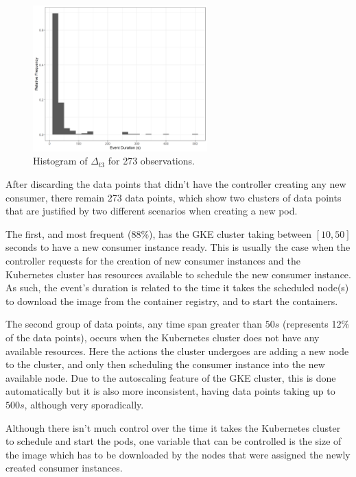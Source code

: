 \begin{figure}[htb!]
\centering
\includegraphics[width=0.6\textwidth]{images/integration/delta3.png}
\caption{
    Histogram of $\Delta_{t3}$ for 273 observations.
}
\label{fig:controller_result_kubernetes}
\end{figure}

After discarding the data points that didn't have the controller creating any
new consumer, there remain 273 data points, which show two clusters of data
points that are justified by two different scenarios when creating a new pod. 

The first, and most frequent (88\%), has the GKE cluster taking between $[10,
50]$ seconds to have a new consumer instance ready. This is usually the case when the
controller requests for the creation of new consumer instances and the
Kubernetes cluster has resources available to schedule the new consumer
instance. As such, the event's duration is related to the time it takes the
scheduled node(s) to download the image from the container registry, and to
start the containers.

The second group of data points, any time span greater than $50s$ (represents
12\% of the data points), occurs when the Kubernetes cluster does not have any
available resources. Here the actions the cluster undergoes are adding a new
node to the cluster, and only then scheduling the consumer instance into the new
available node. Due to the autoscaling feature of the GKE cluster, this is done
automatically but it is also more inconsistent, having data points taking up to
$500s$, although very sporadically.

Although there isn't much control over the time it takes the Kubernetes cluster
to schedule and start the pods, one variable that can be controlled is the size
of the image which has to be downloaded by the nodes that were assigned the
newly created consumer instances.

